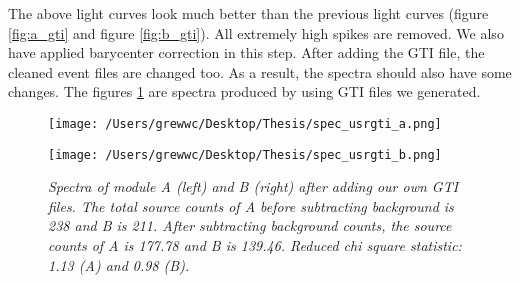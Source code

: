 \documentclass[12pt]{report}
\newcommand{\mycaption}[1]{\caption{\textit{\footnotesize #1}}}
\begin{document}
        \indent The above light curves look much better than the previous light curves 
        (figure \ref{fig:a_gti} 
        and figure \ref{fig:b_gti}). All extremely high spikes are removed. We also have 
        applied barycenter
        correction in this step. After adding the GTI file, the cleaned event files are changed too. As a result, 
        the spectra should also have some changes. The figures \ref{fig:spectra_usrgti}
        are spectra produced by using GTI files we generated.  
        \begin{figure}[!ht] 
          \begin{minipage}{0.45\textwidth}
            \begin{flushleft} 
                \texttt{[image: /Users/grewwc/Desktop/Thesis/spec\_usrgti\_a.png]}
            \end{flushleft}
            \end{minipage}
          \begin{minipage}{0.45\textwidth}
            \begin{flushleft}
            \texttt{[image: /Users/grewwc/Desktop/Thesis/spec\_usrgti\_b.png]}
            \end{flushleft}
          \end{minipage}
          \centering
          \begin{minipage}{0.8\textwidth}
          \mycaption{Spectra of module A (left) and B (right) after adding our own GTI files. 
                    The total source counts of A before subtracting background is 238 and B is 211. 
                    After subtracting background counts, 
                    the source counts of A is 177.78 and B is 139.46. Reduced chi square statistic: 1.13 (A) and 
                    0.98 (B).}
          \label{fig:spectra_usrgti}
          \end{minipage}
          \end{figure}
\end{document}
